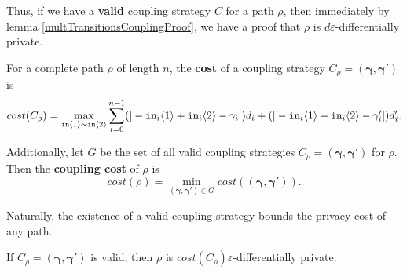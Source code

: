 Thus, if we have a \textbf{valid} coupling strategy $C$ for a path $\rho$, then immediately by lemma \ref{multTransitionsCouplingProof}, we have a proof that $\rho$ is $d\varepsilon$-differentially private. 


\begin{defn}
    For a complete path $\rho$ of length $n$, the \textbf{cost} of a coupling strategy $C_\rho=(\bm{\gamma}, \bm{\gamma}')$ is \[cost(C_\rho) = \max_{\texttt{in}\langle1 \rangle\sim\texttt{in}\langle2 \rangle}\sum_{i=0}^{n-1}(|-\texttt{in}_i\langle1 \rangle+\texttt{in}_i\langle2 \rangle-\gamma_i|)d_i+(|-\texttt{in}_i\langle1 \rangle+\texttt{in}_i\langle2 \rangle-\gamma_i'|)d_i'.\]

    Additionally, let $G$ be the set of all valid coupling strategies $C_\rho=(\bm{\gamma}, \bm{\gamma}')$ for $\rho$. Then the \textbf{coupling cost} of $\rho$ is 
    \[cost(\rho) = \min_{(\bm{\gamma}, \bm{\gamma}')\in G}cost((\bm{\gamma}, \bm{\gamma}')).\]
\end{defn}

Naturally, the existence of a valid coupling strategy bounds the privacy cost of any path. 

\begin{cor}
    If $C_\rho=(\bm{\gamma}, \bm{\gamma}')$ is valid, then $\rho$ is $cost(C_\rho)\varepsilon$-differentially private.
\end{cor}

